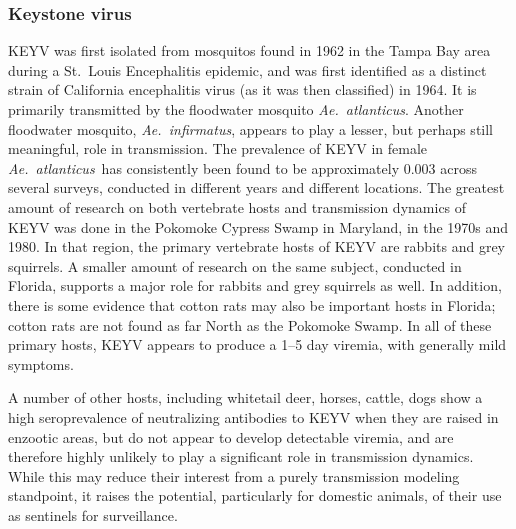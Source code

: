 \documentclass[12pt]{article}
\newcommand{\atl}{\textit{Ae.\ atlanticus}}
\begin{document}
            \subsubsection{Keystone virus}
                KEYV was first isolated from mosquitos found in 1962 in the Tampa Bay area during a St.\ Louis Encephalitis epidemic\cite{chamberlain1969arbovirus, taylor1971california}, and was first identified as a distinct strain of California encephalitis virus (as it was then classified) in 1964\cite{bond1966california}. It is primarily transmitted by the floodwater mosquito \atl. Another floodwater mosquito, \textit{Ae.~infirmatus}, appears to play a lesser, but perhaps still meaningful, role in transmission\cite{taylor1971california}. The prevalence of KEYV in female \atl\ has consistently been found to be approximately 0.003 across several surveys, conducted in different years and different locations\cite{watts1988maintenance,taylor1971california,leduc1975ecology,chamberlain1969arbovirus}. The greatest amount of research on both vertebrate hosts and transmission dynamics of KEYV was done in the Pokomoke Cypress Swamp in Maryland, in the 1970s and 1980\cite{watts1988maintenance}. In that region, the primary vertebrate hosts of KEYV are rabbits and grey squirrels\cite{watts1988maintenance}. A smaller amount of research on the same subject, conducted in Florida, supports a major role for rabbits and grey squirrels as well.\cite{jennings1970tamiami,jennings1968california} In addition, there is some evidence that cotton rats may also be important hosts in Florida\cite{jennings1970tamiami,taylor1971california}; cotton rats are not found as far North as the Pokomoke Swamp\cite{watts1982serologic}. In all of these primary hosts, KEYV appears to produce a 1--5 day viremia\cite{watts1988maintenance,jennings1968california}, with generally mild symptoms\cite{asdf}. %

                A number of other hosts, including whitetail deer, horses, cattle, dogs show a high seroprevalence of neutralizing antibodies to KEYV when they are raised in enzootic areas, but do not appear to develop detectable viremia, and are therefore highly unlikely to play a significant role in transmission dynamics.\cite{parkin1973occurrence,watts1982serologic,watts1979experimental} While this may reduce their interest from a purely transmission modeling standpoint, it raises the potential, particularly for domestic animals, of their use as sentinels for surveillance.\cite{parkin1973occurrence}
\end{document}
